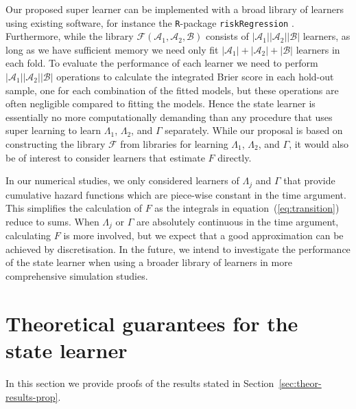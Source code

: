 \documentclass{statsoc}
\newcommand{\1}{\mathds{1}}
\begin{document}
Our proposed super learner can be implemented with a broad library of learners
using existing software, for instance the \texttt{R}-package
\texttt{riskRegression} \citep{Gerds_Ohlendorff_Ozenne_2023}. Furthermore, while
the library \( \mathcal{F}(\mathcal{A}_1,\mathcal{A}_2,\mathcal{B}) \) consists
of \( |\mathcal{A}_1||\mathcal{A}_2||\mathcal{B}| \) learners, as long as we
have sufficient memory we need only fit
\( |\mathcal{A}_1| +|\mathcal{A}_2| + |\mathcal{B}| \) learners in each fold. To
evaluate the performance of each learner we need to perform
\( |\mathcal{A}_1||\mathcal{A}_2||\mathcal{B}| \) operations to calculate the
integrated Brier score in each hold-out sample, one for each combination of the
fitted models, but these operations are often negligible compared to fitting the
models. Hence the state learner is essentially no more computationally demanding
than any procedure that uses super learning to learn $\Lambda_1$, $\Lambda_2$,
and $\Gamma$ separately. While our proposal is based on constructing the library
\( \mathcal{F} \) from libraries for learning \( \Lambda_1 \), $\Lambda_2$, and
$\Gamma$, it would also be of interest to consider learners that estimate
\( F \) directly.

In our numerical studies, we only considered learners of $\Lambda_j$ and
$\Gamma$ that provide cumulative hazard functions which are piece-wise constant
in the time argument. This simplifies the calculation of \( F \) as the
integrals in equation~(\ref{eq:transition}) reduce to sums. When $\Lambda_j$ or
\( \Gamma \) are absolutely continuous in the time argument, calculating \( F \)
is more involved, but we expect that a good approximation can be achieved by
discretisation. In the future, we intend to investigate the performance of the
state learner when using a broader library of learners in more comprehensive
simulation studies.



\appendix

\section{Theoretical guarantees for the state learner}
\label{sec:proof-proposition}

In this section we provide proofs of the results stated in
Section~\ref{sec:theor-results-prop}.
\end{document}
